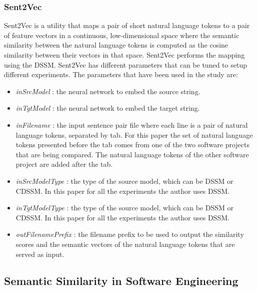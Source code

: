 \documentclass[conference]{IEEEtran}
\begin{document}
\subsubsection{Sent2Vec}
Sent2Vec is a utility that maps a pair of short natural language tokens to a pair of feature vectors in a continuous, low-dimensional space where the semantic similarity between the natural language tokens is computed as the cosine similarity between their vectors in that space. Sent2Vec performs the mapping using the DSSM. 
Sent2Vec has different parameters that can be tuned to setup different experiments. The parameters that have been used in the study are: 
\begin{itemize}
\item{\textit{inSrcModel} : the neural network to embed the source string.}
\item{\textit{inTgtModel} : the neural network to embed the target string.}
\item{\textit{inFilename} : the input sentence pair file where each line is a pair of natural language tokens, separated by tab. For this paper the set of natural language tokens presented before the tab comes from one of the two software projects that are being compared. The natural language tokens of the other software project are added after the tab.   }
\item{\textit{inSrcModelType} : the type of the source model, which can be DSSM or CDSSM. In this paper for all the experiments the author uses DSSM.}
\item{\textit{inTgtModelType} : the type of the source model, which can be DSSM or CDSSM. In this paper for all the experiments the author uses DSSM.}
\item{\textit{outFilenamePrefix} : the filename prefix to be used to output the similarity scores and the semantic vectors of the natural language tokens that are served as input.}
\end{itemize}


\subsection{Semantic Similarity in Software Engineering}
\end{document}
